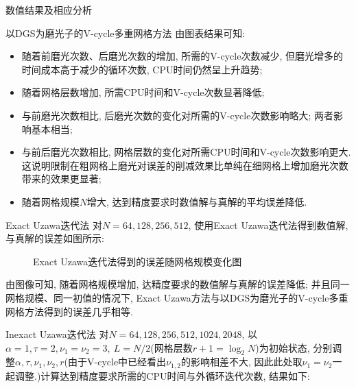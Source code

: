 \documentclass{article}
\begin{document}
\begin{section}{数值结果及相应分析}
\begin{subsection}{以DGS为磨光子的V-cycle多重网格方法}
    由图表结果可知:
    \begin{itemize}
        \item 随着前磨光次数、后磨光次数的增加, 所需的V-cycle次数减少, 但磨光增多的时间成本高于减少的循环次数, CPU时间仍然呈上升趋势;
        \item 随着网格层数增加, 所需CPU时间和V-cycle次数显著降低;
        \item 与前磨光次数相比, 后磨光次数的变化对所需的V-cycle次数影响略大; 两者影响基本相当;
        \item 与前后磨光次数相比, 网格层数的变化对所需CPU时间和V-cycle次数影响更大. 这说明限制在粗网格上磨光对误差的削减效果比单纯在细网格上增加磨光次数带来的效果更显著;
        \item 随着网格规模$N$增大, 达到精度要求时数值解与真解的平均误差降低.
    \end{itemize}
    \end{subsection}

    \begin{subsection}{Exact Uzawa迭代法}
        对$N=64,128,256,512$, 使用Exact Uzawa迭代法得到数值解, 与真解的误差如图所示:
        \begin{figure}[!htbp]
            \centering
        \caption{Exact Uzawa迭代法得到的误差随网格规模变化图}
        \label{fig:error2}
        \end{figure}

        由图像可知, 随着网格规模增加, 达精度要求的数值解与真解的误差降低; 并且同一网格规模、同一初值的情况下, 
        Exact Uzawa方法与以DGS为磨光子的V-cycle多重网格方法得到的误差几乎相等.
    \end{subsection}
    \begin{subsection}{Inexact Uzawa迭代法}
        对$N=64,128,256,512,1024,2048$, 以$\alpha=1,\tau=2,\nu_1=\nu_2=3,\ L=N/2$(网格层数$r+1=\log_2N$)为初始状态, 分别调整$\alpha,\tau,\nu_1,\nu_2,r$(由于V-cycle中已经看出$\nu_{1,2}$的影响相差不大, 因此此处取$\nu_1=\nu_2$一起调整.)计算达到精度要求所需的CPU时间与外循环迭代次数, 结果如下:
        

\end{subsection}
\end{section}
\end{document}
